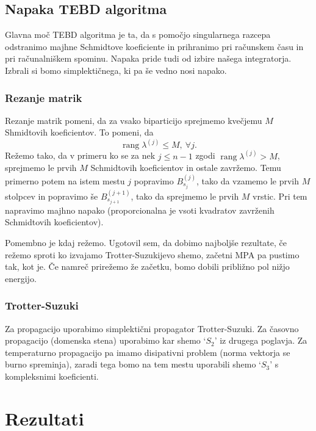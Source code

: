 \documentclass[12pt, a4 paper]{article}
\newcommand{\rang}{
	\operatorname{rang}
}
\begin{document}
\subsection{Napaka TEBD algoritma}

Glavna mo\v c TEBD algoritma je ta, da s pomo\v cjo singularnega razcepa odstranimo majhne Schmidtove koeficiente in
prihranimo pri ra\v cunskem \v casu in pri ra\v cunalni\v skem spominu. Napaka pride tudi od izbire na\v sega integratorja.
Izbrali si bomo simplekti\v cnega, ki pa \v se vedno nosi napako.

\subsubsection{Rezanje matrik}

Rezanje matrik pomeni, da za vsako biparticijo sprejmemo kve\v cjemu $M$ Shmidtovih koeficientov. To pomeni, da
\[
	\rang\lambda^{(j)} \leq M,\ \forall j.
\]
Re\v zemo tako, da v primeru ko se za nek $j \leq n-1$ zgodi  $\rang\lambda^{(j)} > M$, sprejmemo le prvih $M$ Schmidtovih
koeficientov in ostale zavr\v zemo. Temu primerno potem na istem mestu $j$ popravimo $B^{(j)}_{s_j}$, tako da vzamemo le
prvih $M$ stolpcev in popravimo \v se $B^{(j+1)}_{s_{j+1}}$, tako da sprejmemo le prvih $M$ vrstic. Pri tem napravimo majhno
napako (proporcionalna je vsoti kvadratov zavr\v zenih Schmidtovih koeficientov).

Pomembno je kdaj re\v zemo. Ugotovil sem, da dobimo najbolj\v se rezultate, \v ce re\v zemo sproti ko izvajamo
Trotter-Suzukijevo shemo, za\v cetni MPA pa pustimo tak, kot je. \v Ce namre\v c prire\v zemo \v ze za\v cetku, bomo dobili
pribli\v zno pol ni\v zjo energijo.

\subsubsection{Trotter-Suzuki}

Za propagacijo uporabimo simplekti\v cni propagator Trotter-Suzuki. Za \v casovno propagacijo (domenska stena) uporabimo kar
shemo `$S_2$' iz drugega poglavja. Za temperaturno propagacijo pa imamo disipativni problem (norma vektorja se burno
spreminja), zaradi tega bomo na tem mestu uporabili shemo `$S_3$' s kompleksnimi koeficienti.

\section{Rezultati}
\end{document}
